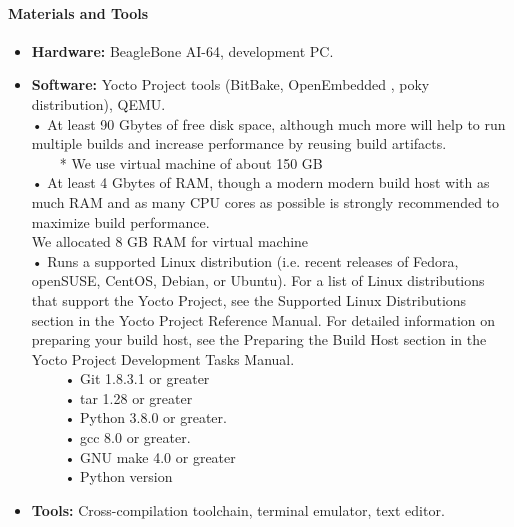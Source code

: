 \paragraph{Materials and Tools}
\begin{itemize}
    \item \textbf{Hardware:} BeagleBone AI-64, development PC.
    \item \textbf{Software:} Yocto Project tools (BitBake, OpenEmbedded , poky distribution), QEMU.\\
    •	At least 90 Gbytes of free disk space, although much more will help to run multiple builds and increase performance by reusing build artifacts.\\
    \indent	 ~~~~* We use virtual machine of about 150 GB\\
    •	At least 4 Gbytes of RAM, though a modern modern build host with as much RAM and as many CPU cores as possible is strongly recommended to maximize build performance.\\
    \indent	We allocated 8 GB RAM for virtual machine \\
    •	Runs a supported Linux distribution (i.e. recent releases of Fedora, openSUSE, CentOS, Debian, or Ubuntu). For a list of Linux distributions that support the Yocto Project, see the Supported Linux Distributions section in the Yocto Project Reference Manual. For detailed information on preparing your build host, see the Preparing the Build Host section in the Yocto Project Development Tasks Manual. \\
    \indent ~~~~	• Git 1.8.3.1 or greater    \\
    \indent ~~~~	• tar 1.28 or greater       \\
    \indent ~~~~	• Python 3.8.0 or greater.  \\
    \indent ~~~~	• gcc 8.0 or greater.       \\
    \indent ~~~~	• GNU make 4.0 or greater   \\
    \indent ~~~~	• Python version 

    \item \textbf{Tools:} Cross-compilation toolchain, terminal emulator, text editor.
\end{itemize}

